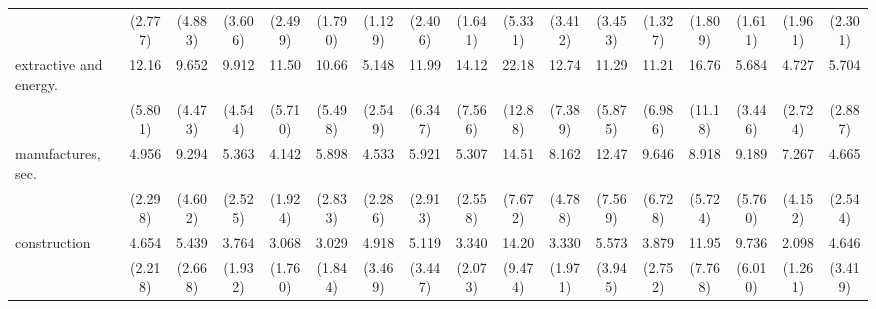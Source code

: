 {\begin{tabular}{l*{16}{c}}
                    &     (2.777)         &     (4.883)         &     (3.606)         &     (2.499)         &     (1.790)         &     (1.129)         &     (2.406)         &     (1.641)         &     (5.331)         &     (3.412)         &     (3.453)         &     (1.327)         &     (1.809)         &     (1.611)         &     (1.961)         &     (2.301)         \\
[1em]
extractive and energy.&       12.16\sym{***}&       9.652\sym{***}&       9.912\sym{***}&       11.50\sym{***}&       10.66\sym{***}&       5.148\sym{***}&       11.99\sym{***}&       14.12\sym{***}&       22.18\sym{***}&       12.74\sym{***}&       11.29\sym{***}&       11.21\sym{***}&       16.76\sym{***}&       5.684\sym{**} &       4.727\sym{**} &       5.704\sym{***}\\
                    &     (5.801)         &     (4.473)         &     (4.544)         &     (5.710)         &     (5.498)         &     (2.549)         &     (6.347)         &     (7.566)         &     (12.88)         &     (7.389)         &     (5.875)         &     (6.986)         &     (11.18)         &     (3.446)         &     (2.724)         &     (2.887)         \\
[1em]
manufactures, sec.  &       4.956\sym{***}&       9.294\sym{***}&       5.363\sym{***}&       4.142\sym{**} &       5.898\sym{***}&       4.533\sym{**} &       5.921\sym{***}&       5.307\sym{***}&       14.51\sym{***}&       8.162\sym{***}&       12.47\sym{***}&       9.646\sym{**} &       8.918\sym{***}&       9.189\sym{***}&       7.267\sym{***}&       4.665\sym{**} \\
                    &     (2.298)         &     (4.602)         &     (2.525)         &     (1.924)         &     (2.833)         &     (2.286)         &     (2.913)         &     (2.558)         &     (7.672)         &     (4.788)         &     (7.569)         &     (6.728)         &     (5.724)         &     (5.760)         &     (4.152)         &     (2.544)         \\
[1em]
construction        &       4.654\sym{**} &       5.439\sym{***}&       3.764\sym{**} &       3.068         &       3.029         &       4.918\sym{*}  &       5.119\sym{*}  &       3.340         &       14.20\sym{***}&       3.330\sym{*}  &       5.573\sym{*}  &       3.879         &       11.95\sym{***}&       9.736\sym{***}&       2.098         &       4.646\sym{*}  \\
                    &     (2.218)         &     (2.668)         &     (1.932)         &     (1.760)         &     (1.844)         &     (3.469)         &     (3.447)         &     (2.073)         &     (9.474)         &     (1.971)         &     (3.945)         &     (2.752)         &     (7.768)         &     (6.010)         &     (1.261)         &     (3.419)         \\

\end{tabular}}
